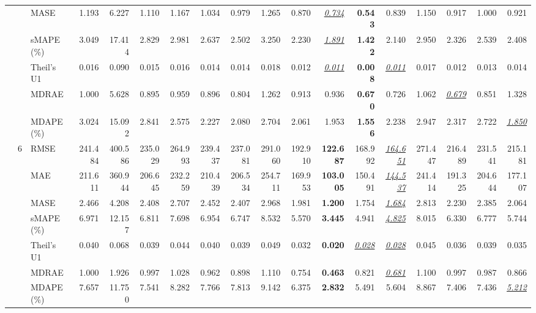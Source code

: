\begin{table}[!htbp]
{\begin{tabular}{lllrrrrrrrrrrrrrrr}
 &  & MASE & 1.193 & 6.227 & 1.110 & 1.167 & 1.034 & 0.979 & 1.265 & 0.870 & \underline{\textit{0.734}} & \textbf{0.543} & 0.839 & 1.150 & 0.917 & 1.000 & 0.921 \\
 &  & sMAPE (\%) & 3.049 & 17.414 & 2.829 & 2.981 & 2.637 & 2.502 & 3.250 & 2.230 & \underline{\textit{1.891}} & \textbf{1.422} & 2.140 & 2.950 & 2.326 & 2.539 & 2.408 \\
 &  & Theil's U1 & 0.016 & 0.090 & 0.015 & 0.016 & 0.014 & 0.014 & 0.018 & 0.012 & \underline{\textit{0.011}} & \textbf{0.008} & \underline{\textit{0.011}} & 0.017 & 0.012 & 0.013 & 0.014 \\
 &  & MDRAE & 1.000 & 5.628 & 0.895 & 0.959 & 0.896 & 0.804 & 1.262 & 0.913 & 0.936 & \textbf{0.670} & 0.726 & 1.062 & \underline{\textit{0.679}} & 0.851 & 1.328 \\
 &  & MDAPE (\%) & 3.024 & 15.092 & 2.841 & 2.575 & 2.227 & 2.080 & 2.704 & 2.061 & 1.953 & \textbf{1.556} & 2.238 & 2.947 & 2.317 & 2.722 & \underline{\textit{1.850}} \\
\cmidrule(lr){2-18}
 & 6 & RMSE & 241.484 & 400.586 & 235.029 & 264.993 & 239.437 & 237.081 & 291.060 & 192.910 & \textbf{122.687} & 168.992 & \underline{\textit{164.651}} & 271.447 & 216.489 & 231.541 & 215.181 \\
 &  & MAE & 211.611 & 360.944 & 206.645 & 232.259 & 210.439 & 206.534 & 254.711 & 169.953 & \textbf{103.005} & 150.491 & \underline{\textit{144.537}} & 241.414 & 191.325 & 204.644 & 177.107 \\
 &  & MASE & 2.466 & 4.208 & 2.408 & 2.707 & 2.452 & 2.407 & 2.968 & 1.981 & \textbf{1.200} & 1.754 & \underline{\textit{1.684}} & 2.813 & 2.230 & 2.385 & 2.064 \\
 &  & sMAPE (\%) & 6.971 & 12.157 & 6.811 & 7.698 & 6.954 & 6.747 & 8.532 & 5.570 & \textbf{3.445} & 4.941 & \underline{\textit{4.825}} & 8.015 & 6.330 & 6.777 & 5.744 \\
 &  & Theil's U1 & 0.040 & 0.068 & 0.039 & 0.044 & 0.040 & 0.039 & 0.049 & 0.032 & \textbf{0.020} & \underline{\textit{0.028}} & \underline{\textit{0.028}} & 0.045 & 0.036 & 0.039 & 0.035 \\
 &  & MDRAE & 1.000 & 1.926 & 0.997 & 1.028 & 0.962 & 0.898 & 1.110 & 0.754 & \textbf{0.463} & 0.821 & \underline{\textit{0.681}} & 1.100 & 0.997 & 0.987 & 0.866 \\
 &  & MDAPE (\%) & 7.657 & 11.750 & 7.541 & 8.282 & 7.766 & 7.813 & 9.142 & 6.375 & \textbf{2.832} & 5.491 & 5.604 & 8.867 & 7.406 & 7.436 & \underline{\textit{5.212}} \\

\end{tabular}}
\end{table}
